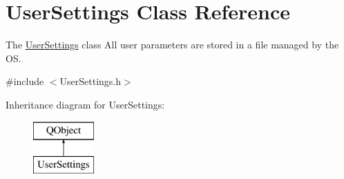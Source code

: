 \hypertarget{class_user_settings}{}\section{User\+Settings Class Reference}
\label{class_user_settings}


The \hyperlink{class_user_settings}{User\+Settings} class All user parameters are stored in a file managed by the OS.  




{\ttfamily \#include $<$User\+Settings.\+h$>$}

Inheritance diagram for User\+Settings\+:\begin{figure}[H]
\begin{center}
\leavevmode
\includegraphics[height=2.000000cm]{class_user_settings}
\end{center}
\end{figure}
